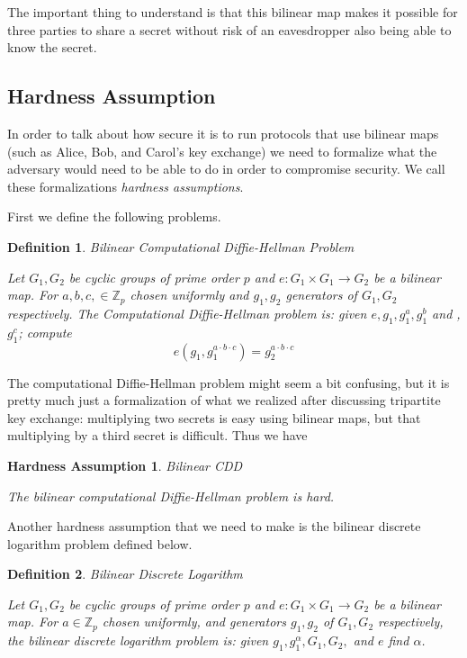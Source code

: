 \documentclass[12pt,twoside]{reedthesis}
\newtheorem{definition}{Definition}
\newtheorem{assumption}{Hardness Assumption}
\newcommand{\Z}[0]{\mathbb{Z}}
\begin{document}
\par The important thing to understand is that this bilinear map makes it possible for three parties to share a secret without risk of an eavesdropper also being able to know the secret. 


    \subsection{Hardness Assumption}
    
    In order to talk about how secure it is to run protocols that use bilinear maps (such as Alice, Bob, and Carol's key exchange) we need to formalize what the adversary would need to be able to do in order to compromise security. We call these formalizations \textit{hardness assumptions}.
    \par First we define the following problems.
    
    \begin{definition}{Bilinear Computational Diffie-Hellman Problem}
    \par Let $G_1,G_2$ be cyclic groups of prime order $p$ and $e:G_1 \times G_1 \to G_2$ be a bilinear map. For $a,b,c,\in \Z_p$ chosen uniformly and $g_1,g_2$ generators of $G_1,G_2$ respectively. The Computational Diffie-Hellman problem is: given $e,g_1,g_1^a,g_1^b$ and ,$g_1^c$; compute $$e(g_1,g_1^{a\cdot b \cdot c}) = g_2^{a\cdot b \cdot c}$$
    \end{definition}
    
    The computational Diffie-Hellman problem might seem a bit confusing, but it is pretty much just a formalization of what we realized after discussing tripartite key exchange: multiplying two secrets is easy using bilinear maps, but that multiplying by a third secret is difficult. Thus we have
    \begin{assumption}{Bilinear CDD}
    \par The bilinear computational Diffie-Hellman problem is hard.
        \end{assumption}
        
        \par Another hardness assumption that we need to make is the bilinear discrete logarithm problem defined below.
       
    \begin{definition}{Bilinear Discrete Logarithm}
    \par Let $G_1,G_2$ be cyclic groups of prime order $p$ and $e:G_1 \times G_1 \to G_2$ be a bilinear map. For $a \in \Z_p$ chosen uniformly, and generators $g_1,g_2$ of $G_1,G_2$ respectively, the bilinear discrete logarithm problem is: given $g_1,g_1^\alpha, G_1, G_2,$ and $e$ find $\alpha$.
    \end{definition}
    
\end{document}
